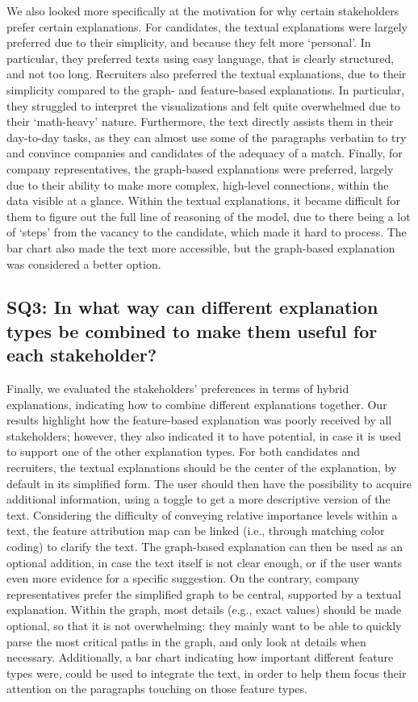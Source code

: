 We also looked more specifically at the motivation for why certain stakeholders prefer certain explanations. For candidates, the textual explanations were largely preferred due to their simplicity, and because they felt more `personal'. In particular, they preferred texts using easy language, that is clearly structured, and not too long. Recruiters also preferred the textual explanations, due to their simplicity compared to the graph- and feature-based explanations. In particular, they struggled to interpret the visualizations and felt quite overwhelmed due to their `math-heavy' nature. Furthermore, the text directly assists them in their day-to-day tasks, as they can almost use some of the paragraphs verbatim to try and convince companies and candidates of the adequacy of a match. Finally, for company representatives, the graph-based explanations were preferred, largely due to their ability to make more complex, high-level connections, within the data visible at a glance. Within the textual explanations, it became difficult for them to figure out the full line of reasoning of the model, due to there being a lot of `steps' from the vacancy to the candidate, which made it hard to process. The bar chart also made the text more accessible, but the graph-based explanation was considered a better option.

\subsection{SQ3: In what way can different explanation types be combined to make them useful for each stakeholder?}

Finally, we evaluated the stakeholders' preferences in terms of hybrid explanations, indicating how to combine different explanations together. Our results highlight how the feature-based explanation was poorly received by all stakeholders; however, they also indicated it to have potential, in case it is used to support one of the other explanation types. For both candidates and recruiters, the textual explanations should be the center of the explanation, by default in its simplified form. The user should then have the possibility to acquire additional information, using a toggle to get a more descriptive version of the text. Considering the difficulty of conveying relative importance levels within a text, the feature attribution map can be linked (i.e., through matching color coding) to clarify the text. The graph-based explanation can then be used as an optional addition, in case the text itself is not clear enough, or if the user wants even more evidence for a specific suggestion. On the contrary, company representatives prefer the simplified graph to be central, supported by a textual explanation. Within the graph, most details (e.g., exact values) should be made optional, so that it is not overwhelming: they mainly want to be able to quickly parse the most critical paths in the graph, and only look at details when necessary. Additionally, a bar chart indicating how important different feature types were, could be used to integrate the text, in order to help them focus their attention on the paragraphs touching on those feature types. 

